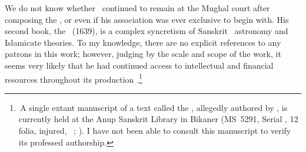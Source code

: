 We do not know whether \Nityananda\ continued to remain at the Mughal court after composing the \Siddhantasindhu, or even if his association was ever exclusive to begin with. His second book, the \Sarvasiddhantaraja\ (1639), is a complex syncretism of Sanskrit \siddhantic\ astronomy and Islamicate theories. To my knowledge, there are no explicit references to any patrons in this work; however, judging by the scale and scope of the work, it seems very likely that he had continued access to intellectual and financial resources throughout its production \parencite[more on this in][]{MisraTD}.\footnote{\,A single extant manuscript of a text called the \Shahajahamganita, allegedly authored by \Nityananda, is currently held at the Anup Sanskrit Library in Bikaner (MS~5291, Serial , 12 folia, injured, \vid\ \cite[p.\thinspace 174a in Volume A3]{PingreeCESS}; \cite[393]{AnupSanskritLibrary}). I have not been able to consult this manuscript to verify its professed authorship.} 

 






